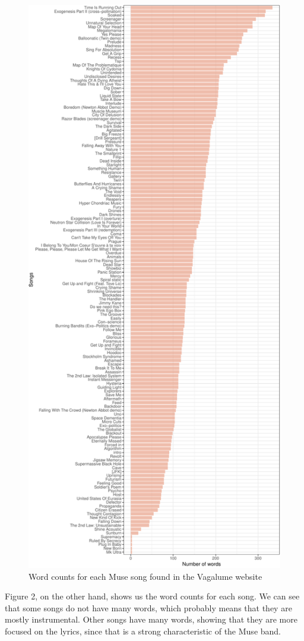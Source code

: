 \documentclass[]{article}
\begin{document}
\begin{figure}[H]

{\centering \includegraphics{assign_files/figure-latex/unnamed-chunk-7-1} 

}

\caption{Word counts for each Muse song found in the Vagalume website}\label{fig:unnamed-chunk-7}
\end{figure}

Figure 2, on the other hand, shows us the word counts for each song. We
can see that some songs do not have many words, which probably means
that they are mostly instrumental. Other songs have many words, showing
that they are more focused on the lyrics, since that is a strong
characteristic of the Muse band.


\end{document}
